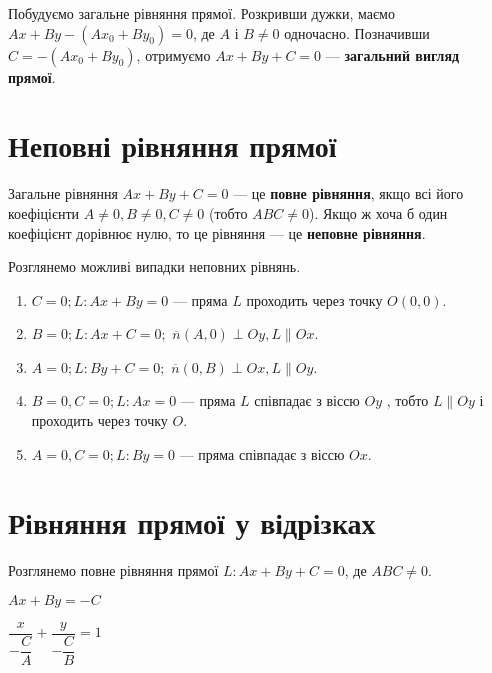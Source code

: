 Побудуємо загальне рівняння прямої. Розкривши дужки, маємо $Ax + By - (Ax_0 + By_0) = 0$, де $A$ і $B \neq 0$
одночасно. Позначивши $C = -(Ax_0 + By_0)$, отримуємо $Ax + By + C = 0$ --- \textbf{загальний вигляд прямої}.  

\section{Неповні рівняння прямої}

\begin{definition}
	Загальне рівняння $Ax + By + C = 0$ --- це \textbf{повне рівняння}, якщо всі його
	коефіцієнти $A \neq 0, B \neq 0, C \neq 0$ (тобто $ABC \neq 0$). Якщо ж хоча б один коефіцієнт
	дорівнює нулю, то це рівняння --- це \textbf{неповне рівняння}.
\end{definition}

Розглянемо можливі випадки неповних рівнянь.
\begin{enumerate}
\item $C = 0; L: Ax + By = 0$ --- пряма $L$ проходить через точку $O(0,0)$.
\item $B = 0; L: Ax + C = 0;$ $\overline{n}(A, 0) \perp Oy, L \parallel Ox$.
\item $A = 0; L: By + C = 0;$ $\overline{n}(0, B) \perp Ox, L \parallel Oy$.
\item $B = 0, C = 0; L: Ax = 0$ --- пряма $L$ співпадає з віссю $Oy$ , тобто $L \parallel Oy$ і проходить через точку $O$.
\item $A = 0, C = 0; L: By = 0$ --- пряма співпадає з віссю $Ox$.
\end{enumerate}

\section{Рівняння прямої у відрізках}

Розглянемо повне рівняння прямої $L: Ax + By + C = 0$, де $ABC \neq 0$.

\parbox{140px}{}
\parbox{140px}{$Ax + By = -C$
	
$\dfrac{x}{-\dfrac{C}{A}} + \dfrac{y}{-\dfrac{C}{B}} = 1$}

